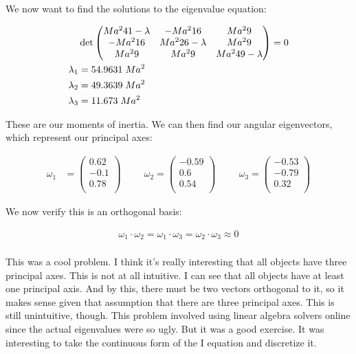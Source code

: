 \documentclass[10pt]{article} %
\begin{document}
We now want to find the solutions to the eigenvalue equation:

\begin{align*}
  &\det
  \begin{pmatrix}
    Ma^241-\lambda & -Ma^216 & Ma^29\\
    -Ma^216 & Ma^226-\lambda & Ma^29\\
    Ma^29 & Ma^29 & Ma^249-\lambda\\
  \end{pmatrix} = 0\\
  \lambda_1 &= 54.9631\hspace{0.1cm}Ma^2\\
  \lambda_2 &= 49.3639\hspace{0.1cm}Ma^2\\
  \lambda_3 &= 11.673\hspace{0.1cm}Ma^2\\
\end{align*}

These are our moments of inertia. We can then find our angular eigenvectors, which represent our principal axes:

\begin{align*}
  \omega_1 &=
  \begin{pmatrix}
    0.62\\
    -0.1\\
    0.78\\
  \end{pmatrix}\hspace{1cm}
  \omega_2 =
  \begin{pmatrix}
    -0.59\\
    0.6\\
    0.54\\
  \end{pmatrix}\hspace{1cm}
  \omega_3 =
  \begin{pmatrix}
    -0.53\\
    -0.79\\
    0.32\\
  \end{pmatrix}
\end{align*}

We now verify this is an orthogonal basis:

\begin{align*}
  \omega_1 \cdot \omega_2 = \omega_1 \cdot \omega_3 = \omega_2 \cdot \omega_3 \approx 0\\
\end{align*}

This was a cool problem. I think it's really interesting that all objects have three principal axes. This is not at all intuitive. I can see that all objects have at least one principal axis. And by this, there must be two vectors orthogonal to it, so it makes sense given that assumption that there are three principal axes. This is still unintuitive, though. This problem involved using linear algebra solvers online since the actual eigenvalues were so ugly. But it was a good exercise. It was interesting to take the continuous form of the I equation and discretize it.\\
\end{document}
